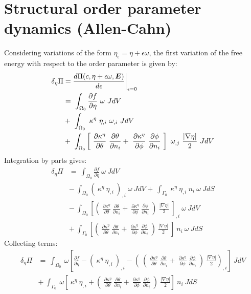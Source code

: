 \section{Structural order parameter dynamics (Allen-Cahn)}
Considering variations of the form $\eta_{\epsilon} = \eta + \epsilon \omega$, the first variation of the free energy with respect to the order parameter is given by:
\begin{align}
\delta_{\eta}\Pi &= \frac{d \Pi(c, \eta + \epsilon \omega, \mbox{\boldmath$ E$})}{d\epsilon} \bigg|_{\epsilon=0} \notag  \nonumber \\
  &= ~\int_{\Omega_0}  \frac{\partial f}{\partial \eta}~\omega ~J dV  \nonumber \\
  &+ ~\int_{\Omega_0}  ~\kappa^\eta~\eta_{,i}~\omega_{,i} ~J dV  \nonumber \\
  &+ ~\int_{\Omega_0}  \left[ ~\frac{\partial \kappa^\eta}{\partial \theta}  ~\frac{\partial \theta}{\partial n_i} +  ~\frac{\partial \kappa^\eta}{\partial \phi} ~\frac{\partial \phi}{\partial n_i} ~\right] ~\omega_{,j} ~\frac{|\nabla \eta|}{2} ~J dV 
\end{align}
Integration by parts gives:
\begin{align}
\delta_{\eta}\Pi &= ~\int_{\Omega_0}  \frac{\partial f}{\partial \eta}~\omega ~J dV  \nonumber \\
  &- ~\int_{\Omega_0}  \left(~\kappa^\eta~\eta_{,i}~\right)_{,i} ~\omega ~J dV + ~\int_{\Gamma_0} ~\kappa^\eta~\eta_{,i} ~n_{i} ~\omega ~J dS  \nonumber \\
  &- ~\int_{\Omega_0}  \left[ \left( ~\frac{\partial \kappa^\eta}{\partial \theta} ~\frac{\partial \theta}{\partial n_i} +  ~\frac{\partial \kappa^\eta}{\partial \phi} ~\frac{\partial \phi}{\partial n_i} ~\right) ~\frac{|\nabla \eta|}{2} ~\right]_{,i} ~\omega ~J dV  \nonumber \\
  &+ ~\int_{\Gamma_0}  \left[ \left( ~\frac{\partial \kappa^\eta}{\partial \theta} ~\frac{\partial \theta}{\partial n_i} +  ~\frac{\partial \kappa^\eta}{\partial \phi} ~\frac{\partial \phi}{\partial n_i} ~\right) ~\frac{|\nabla \eta|}{2} ~\right] ~n_{i} ~\omega ~J dS 
\end{align}
Collecting terms:
\begin{align}
\delta_{\eta}\Pi &= ~\int_{\Omega_0}  ~\omega \left[\frac{\partial f}{\partial \eta} - \left(~\kappa^\eta~\eta_{,i}~\right)_{,i} - \left( ~\left(~\frac{\partial \kappa^\eta}{\partial \theta} ~\frac{\partial \theta}{\partial n_i} +  ~\frac{\partial \kappa^\eta}{\partial \phi} ~\frac{\partial \phi}{\partial n_i} ~\right) ~\frac{|\nabla \eta|}{2} \right)_{,i}  \right] ~J dV  \nonumber \\
  &+ ~\int_{\Gamma_0} ~\omega \left[ ~\kappa^\eta~\eta_{,i}  + \left( ~\frac{\partial \kappa^\eta}{\partial \theta} ~\frac{\partial \theta}{\partial n_i} +  ~\frac{\partial \kappa^\eta}{\partial \phi} ~\frac{\partial \phi}{\partial n_i} ~\right) ~\frac{|\nabla \eta|}{2}  \right] ~n_{i} ~J dS
\end{align}
